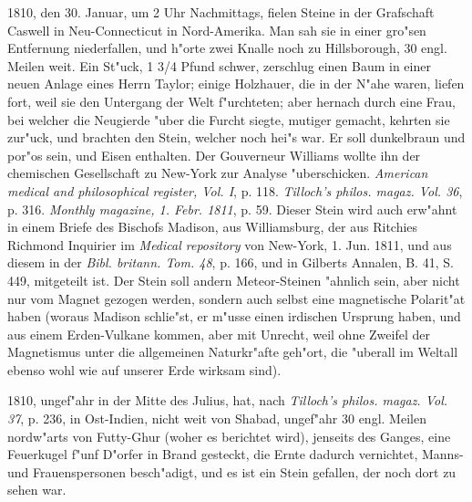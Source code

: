 \documentclass[a4paper, 11pt, oneside, polutonikogreek, german]{article}
\begin{document}
1810, den 30. Januar, um 2 Uhr Nachmittags, fielen Steine in der Grafschaft Caswell in Neu-Connecticut in Nord-Amerika. Man sah sie in einer gro"sen Entfernung niederfallen, und h"orte zwei Knalle noch zu Hillsborough, 30 engl. Meilen weit. Ein St"uck, 1 3/4 Pfund schwer, zerschlug einen Baum in einer neuen Anlage eines Herrn Taylor; einige Holzhauer, die in der N"ahe waren, liefen fort, weil sie den Untergang der Welt f"urchteten; aber hernach durch eine Frau, bei welcher die Neugierde "uber die Furcht siegte, mutiger gemacht, kehrten sie zur"uck, und brachten den Stein, welcher noch hei"s war. Er soll dunkelbraun und por"os sein, und Eisen enthalten. Der Gouverneur Williams wollte ihn der chemischen Gesellschaft zu New-York zur Analyse "uberschicken. \emph{American medical and philosophical register, Vol. I}, p. 118. \emph{Tilloch's philos. magaz. Vol. 36}, p. 316. \emph{Monthly magazine, 1. Febr. 1811}, p. 59. Dieser Stein wird auch erw"ahnt in einem Briefe des Bischofs Madison, aus Williamsburg, der aus Ritchies Richmond Inquirier im \emph{Medical repository} von New-York, 1. Jun. 1811, und aus diesem in der \emph{Bibl. britann. Tom. 48}, p. 166, und in Gilberts Annalen, B. 41, S. 449, mitgeteilt ist. Der Stein soll andern Meteor-Steinen "ahnlich sein, aber nicht nur vom Magnet gezogen werden, sondern auch selbst eine magnetische Polarit"at haben (woraus Madison schlie"st, er m"usse einen irdischen Ursprung haben, und aus einem Erden-Vulkane kommen, aber mit Unrecht, weil ohne Zweifel der Magnetismus unter die allgemeinen Naturkr"afte geh"ort, die "uberall im Weltall ebenso wohl wie auf unserer Erde wirksam sind).

1810, ungef"ahr in der Mitte des Julius, hat, nach \emph{Tilloch's philos. magaz. Vol. 37}, p. 236, in Ost-Indien, nicht weit von Shabad, ungef"ahr 30 engl. Meilen nordw"arts von Futty-Ghur (woher es berichtet wird), jenseits des Ganges, eine Feuerkugel f"unf D"orfer in Brand gesteckt, die Ernte dadurch vernichtet, Manns- und Frauenspersonen besch"adigt, und es ist ein Stein gefallen, der noch dort zu sehen war.
\end{document}

